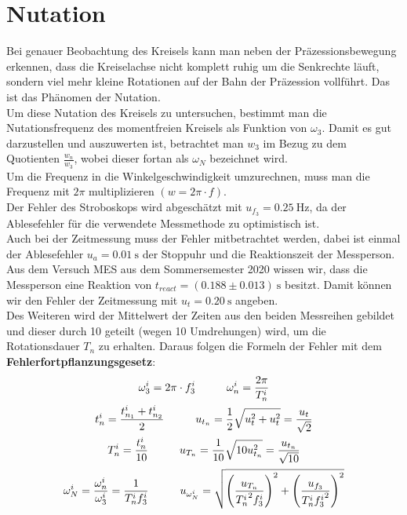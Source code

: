 

\section{Nutation}

Bei genauer Beobachtung des Kreisels kann man neben der Präzessionsbewegung erkennen, dass die Kreiselachse nicht komplett ruhig um die Senkrechte läuft, sondern viel mehr kleine Rotationen auf der Bahn der Präzession vollführt. Das ist das Phänomen der Nutation.\\
Um diese Nutation des Kreisels zu untersuchen, bestimmt man die Nutationsfrequenz des momentfreien Kreisels als Funktion von $\omega_3$. Damit es gut darzustellen und auszuwerten ist, betrachtet man $w_3$ im Bezug zu dem Quotienten $\frac{w_n}{w_3}$, wobei dieser fortan als $\omega_N$ bezeichnet wird. \\
Um die Frequenz in die Winkelgeschwindigkeit umzurechnen, muss man die Frequenz mit $2\pi$ multiplizieren $(w =2\pi\cdot f)$.\\
Der Fehler des Stroboskops wird abgeschätzt mit $u_{f_3}=0.25~\text{Hz}$, da der Ablesefehler für die verwendete Messmethode zu optimistisch ist. \\
Auch bei der Zeitmessung muss der Fehler mitbetrachtet werden, dabei ist einmal der Ablesefehler $u_a=0.01~\text{s}$ der Stoppuhr und die Reaktionszeit der Messperson. Aus dem Versuch MES aus dem Sommersemester 2020 wissen wir, dass die Messperson eine Reaktion von $t_{react}=(0.188\pm0.013)~\text{s}$ besitzt. Damit können wir den Fehler der Zeitmessung mit $u_t=0.20~\text{s}$ angeben. \\
Des Weiteren wird der Mittelwert der Zeiten aus den beiden Messreihen gebildet und dieser durch 10 geteilt (wegen 10 Umdrehungen) wird, um die Rotationsdauer $T_n$ zu erhalten. Daraus folgen die Formeln der Fehler mit dem \textbf{Fehlerfortpflanzungsgesetz}:
\begin{gather}
    \omega_3^i=2\pi\cdot f_3^i  \tab \omega_n^i = \frac{2\pi}{T_n^i}\\
    t_n^i = \frac{t_{n_1}^i+t_{n_2}^i}{2}\tab u_{t_n} = \frac{1}{2}\sqrt{u_t^2+u_t^2}=\frac{u_t}{\sqrt{2}}\\
    T_n^i=\frac{t_n^i}{10} \tab u_{T_n} = \frac{1}{10}\sqrt{10u_{t_n}^2} = \frac{u_{t_n}}{\sqrt{10}}\\[0.3mm]
    \omega_N^i=\frac{\omega_n^i}{\omega_3^i} = \frac{1}{T_n^i f_3^i} 
    \tab u_{\omega_N^i} = \sqrt{\left(\frac{u_{T_n}}{{T_n^i}^2f_3^i}\right)^2+\left(\frac{u_{f_3}}{T_n^i{f_3^i}^2}\right)^2} 
\end{gather}
